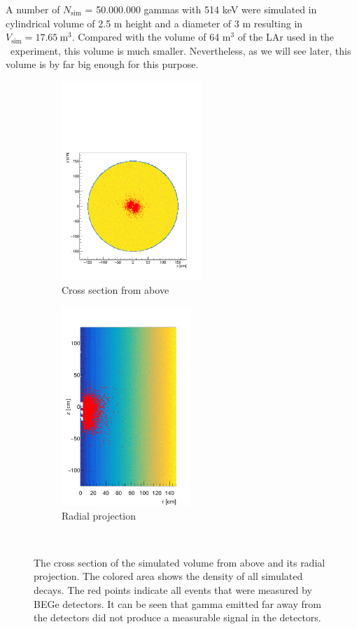 \documentclass[encoding=utf8,british]{tumphthesis}
\begin{document}
A number of $N_{\mathrm{sim}}$ = 50.000.000 gammas with 514 keV were simulated in cylindrical volume of 2.5 m height and a diameter of 3 m resulting in $V_{\mathrm{sim}} = 17.65 ~\mathrm{m}^3$.
Compared with the volume of 64 m\(^3\) of the LAr used in the \gerda\ experiment, this volume is much smaller.
Nevertheless, as we will see later, this volume is by far big enough for this purpose.
\\

\begin{figure}[t!]
	\centering
	\begin{subfigure}{.5\textwidth}
		\centering
		\includegraphics[height=75mm]{./Bilder/MC-Querschnitt-BEGes.pdf}
		\caption{Cross section from above}
		\label{fig:CrossSecAb}
	\end{subfigure}\hfill%
	\begin{subfigure}{.5\textwidth}
		\centering
		\includegraphics[height=75mm]{./Bilder/MC-Radius-BEGes.png}
		\caption{Radial projection}
		\label{fig:CrossSecRa}
	\end{subfigure}
    \\
	\vspace{0.5cm}
    \caption{
    	The cross section of the simulated volume from above and its radial projection.
    	The colored area shows the density of all simulated decays. 
    	The red points indicate all events that were measured by BEGe detectors.
    	It can be seen that gamma emitted far away from the detectors did not produce a measurable signal in the detectors.
    	}
\vspace{0.5cm}
\end{figure}
\\
\end{document}
